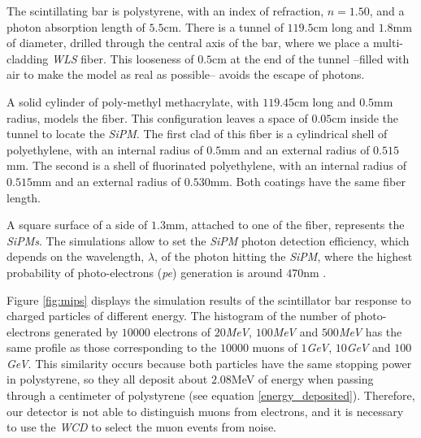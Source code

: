 \documentclass[submitting]{nst}
\begin{document}
The scintillating bar is polystyrene, with an index of refraction, $n=1.50$, and a photon absorption length of $5.5$cm. There is a tunnel of $119.5$cm long and $1.8$mm of diameter, drilled through the central axis of the bar, where we place a multi-cladding \textsl{WLS} fiber. This looseness of $0.5$cm at the end of the tunnel --filled with air to make the model as real as possible-- avoids the escape of photons.

A solid cylinder of poly-methyl methacrylate, with $119.45$cm long and $0.5$mm radius, models the fiber. This configuration leaves a space of $0.05$cm inside the tunnel to locate the \textsl{SiPM}. The first clad of this fiber is a cylindrical shell of polyethylene, with an internal radius of $0.5$mm and an external radius of $0.515$mm. The second is a shell of fluorinated polyethylene, with an internal radius of $0.515$mm and an external radius of $0.530$mm. Both coatings have the same fiber length.

A square surface of a side of $1.3$mm, attached to one of the fiber, represents the \textsl{SiPMs}. The simulations allow to set the \textsl{SiPM} photon detection efficiency, which depends on the wavelength, $\lambda$, of the photon hitting the \textsl{SiPM}, where the highest probability of photo-electrons (\textsl{pe}) generation is around $470$nm \cite{Hamamatsu2018}.

Figure \ref{fig:mips} displays the simulation results of the scintillator bar response to charged particles of different energy. The histogram of the number of photo-electrons generated by $10000$ electrons of $20$\textsl{MeV}, $100$\textsl{MeV} and $500$\textsl{MeV} has the same profile as those corresponding to the $10000$ muons of $1$\textsl{GeV}, $10$\textsl{GeV} and $100$\textsl{GeV}. This similarity occurs because both particles have the same stopping power in polystyrene, so they all deposit about $2.08$MeV of energy when passing through a centimeter of polystyrene (see equation \ref{energy_deposited}). Therefore, our detector is not able to distinguish muons from electrons, and it is necessary to use the \textsl{WCD} to select the muon events from noise. 
\end{document}

